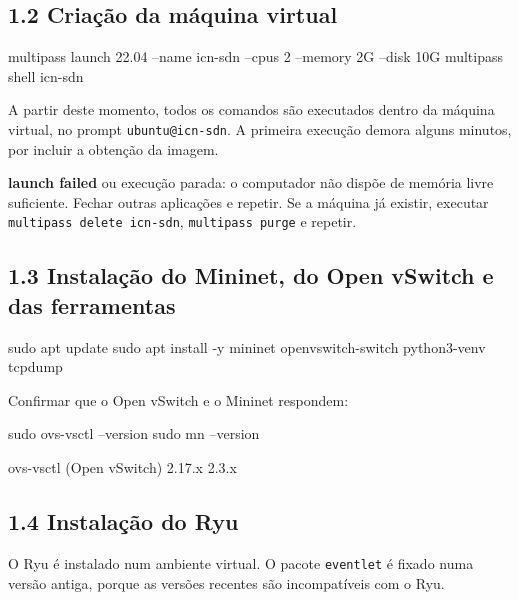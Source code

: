\documentclass[11pt,a4paper]{article}
\newcommand{\cmd}[1]{\texttt{#1}}
\begin{document}
\subsection*{1.2 Criação da máquina virtual}

\begin{terminal}
multipass launch 22.04 --name icn-sdn --cpus 2 --memory 2G --disk 10G
multipass shell icn-sdn
\end{terminal}


A partir deste momento, todos os comandos são executados dentro da máquina virtual, no prompt \cmd{ubuntu@icn-sdn}. A primeira execução demora alguns minutos, por incluir a obtenção da imagem.

\begin{erro}
\textbf{launch failed} ou execução parada: o computador não dispõe de memória livre suficiente. Fechar outras aplicações e repetir. Se a máquina já existir, executar \cmd{multipass delete icn-sdn}, \cmd{multipass purge} e repetir.
\end{erro}

\subsection*{1.3 Instalação do Mininet, do Open vSwitch e das ferramentas}

\begin{terminal}
sudo apt update
sudo apt install -y mininet openvswitch-switch python3-venv tcpdump
\end{terminal}

Confirmar que o Open vSwitch e o Mininet respondem:

\begin{terminal}
sudo ovs-vsctl --version
sudo mn --version
\end{terminal}

\begin{saida}
ovs-vsctl (Open vSwitch) 2.17.x
2.3.x
\end{saida}

\subsection*{1.4 Instalação do Ryu}

O Ryu é instalado num ambiente virtual. O pacote \cmd{eventlet} é fixado numa versão antiga, porque as versões recentes são incompatíveis com o Ryu.
\end{document}
